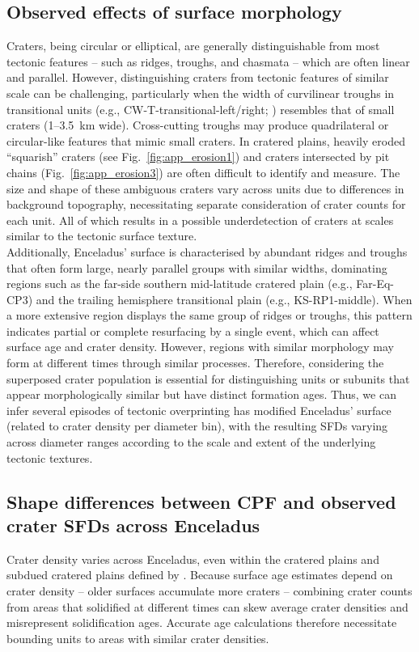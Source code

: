 \documentclass[preprint,11pt,3p,times,authoryear]{elsarticle}
\begin{document}
\subsection{Observed effects of surface morphology}
\label{sub:geomorphology}
Craters, being circular or elliptical, are generally distinguishable from most tectonic features -- such as ridges, troughs, and chasmata -- which are often linear and parallel. However, distinguishing craters from tectonic features of similar scale can be challenging, particularly when the width of curvilinear troughs in transitional units (e.g., CW-T-transitional-left/right; \citet{CrowWillard2015}) resembles that of small craters (1–3.5~km wide). Cross-cutting troughs may produce quadrilateral or circular-like features that mimic small craters. In cratered plains, heavily eroded ``squarish'' craters (see Fig.~\ref{fig:app_erosion1}) and craters intersected by pit chains (Fig.~\ref{fig:app_erosion3}) are often difficult to identify and measure. The size and shape of these ambiguous craters vary across units due to differences in background topography, necessitating separate consideration of crater counts for each unit. All of which results in a possible underdetection of craters at scales similar to the tectonic surface texture.\\

Additionally, Enceladus’ surface is characterised by abundant ridges and troughs that often form large, nearly parallel groups with similar widths, dominating regions such as the far-side southern mid-latitude cratered plain (e.g., Far-Eq-CP3) and the trailing hemisphere transitional plain (e.g., KS-RP1-middle). When a more extensive region displays the same group of ridges or troughs, this pattern indicates partial or complete resurfacing by a single event, which can affect surface age and crater density. However, regions with similar morphology may form at different times through similar processes. Therefore, considering the superposed crater population is essential for distinguishing units or subunits that appear morphologically similar but have distinct formation ages. Thus, we can infer several episodes of tectonic overprinting has modified Enceladus' surface (related to crater density per diameter bin), with the resulting SFDs varying across diameter ranges according to the scale and extent of the underlying tectonic textures. 

\subsection{Shape differences between CPF and observed crater SFDs across Enceladus}
\label{sub:crater_distribution}
Crater density varies across Enceladus, even within the cratered plains and subdued cratered plains defined by \citet{CrowWillard2015}. Because surface age estimates depend on crater density -- older surfaces accumulate more craters -- combining crater counts from areas that solidified at different times can skew average crater densities and misrepresent solidification ages. Accurate age calculations therefore necessitate bounding units to areas with similar crater densities.\\
\end{document}
